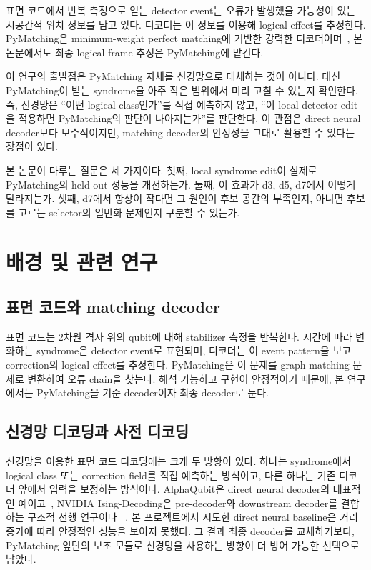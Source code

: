 \documentclass[aps,prd,12pt,twocolumn,superscriptaddress,showkeys,floatfix]{revtex4-2}
\begin{document}
표면 코드에서 반복 측정으로 얻는 detector event는 오류가 발생했을 가능성이
있는 시공간적 위치 정보를 담고 있다. 디코더는 이 정보를 이용해 logical
effect를 추정한다. PyMatching은 minimum-weight perfect matching에 기반한
강력한 디코더이며~\cite{pymatching}, 본 논문에서도 최종 logical frame 추정은
PyMatching에 맡긴다.

이 연구의 출발점은 PyMatching 자체를 신경망으로 대체하는 것이 아니다.
대신 PyMatching이 받는 syndrome을 아주 작은 범위에서 미리 고칠 수 있는지
확인한다. 즉, 신경망은 ``어떤 logical class인가''를 직접 예측하지 않고,
``이 local detector edit을 적용하면 PyMatching의 판단이 나아지는가''를
판단한다. 이 관점은 direct neural decoder보다 보수적이지만, matching decoder의
안정성을 그대로 활용할 수 있다는 장점이 있다.

본 논문이 다루는 질문은 세 가지이다. 첫째, local syndrome edit이 실제로
PyMatching의 held-out 성능을 개선하는가. 둘째, 이 효과가 d3, d5, d7에서
어떻게 달라지는가. 셋째, d7에서 향상이 작다면 그 원인이 후보 공간의 부족인지,
아니면 후보를 고르는 selector의 일반화 문제인지 구분할 수 있는가.

\section{배경 및 관련 연구}

\subsection{표면 코드와 matching decoder}

표면 코드는 2차원 격자 위의 qubit에 대해 stabilizer 측정을 반복한다. 시간에
따라 변화하는 syndrome은 detector event로 표현되며, 디코더는 이 event pattern을
보고 correction의 logical effect를 추정한다. PyMatching은 이 문제를 graph
matching 문제로 변환하여 오류 chain을 찾는다. 해석 가능하고 구현이 안정적이기
때문에, 본 연구에서는 PyMatching을 기준 decoder이자 최종 decoder로 둔다.

\subsection{신경망 디코딩과 사전 디코딩}

신경망을 이용한 표면 코드 디코딩에는 크게 두 방향이 있다. 하나는 syndrome에서
logical class 또는 correction field를 직접 예측하는 방식이고, 다른 하나는
기존 디코더 앞에서 입력을 보정하는 방식이다. AlphaQubit은 direct neural
decoder의 대표적인 예이고~\cite{alphaqubit}, NVIDIA Ising-Decoding은
pre-decoder와 downstream decoder를 결합하는 구조적 선행 연구이다
~\cite{nvidiaising}. 본 프로젝트에서 시도한 direct neural baseline은 거리
증가에 따라 안정적인 성능을 보이지 못했다. 그 결과 최종 decoder를
교체하기보다, PyMatching 앞단의 보조 모듈로 신경망을 사용하는 방향이 더 방어
가능한 선택으로 남았다.
\end{document}
